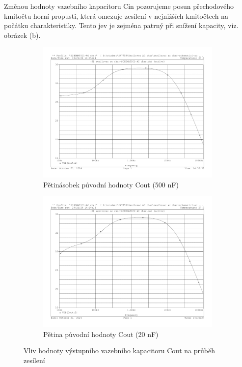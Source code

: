 \documentclass[a4paper, czech]{article}
\begin{document}
Změnou hodnoty vazebního kapacitoru Cin pozorujeme posun přechodového kmitočtu horní propusti, která omezuje zesílení v nejnižších kmitočtech na počátku charakteristiky.
Tento jev je zejména patrný při snížení kapacity, viz. obrázek (b).

\begin{figure}[H]
    \centering
    \begin{subfigure}{0.49\textwidth}
        \centering
        \includegraphics[width=\textwidth]{charakteristiky/uloha3_Cout_5krat_vetsi_500n.pdf}
        \caption{Pětinásobek původní hodnoty Cout (500 nF)}
    \end{subfigure}
    \hfill
    \begin{subfigure}{0.49\textwidth}
        \centering
        \includegraphics[width=\textwidth]{charakteristiky/uloha3_Cout_5krat_mensi_20n.pdf}
        \caption{Pětina původní hodnoty Cout (20 nF)}
    \end{subfigure}
    \caption{Vliv hodnoty výstupního vazebního kapacitoru Cout na průběh zesílení}
\end{figure}
\end{document}

